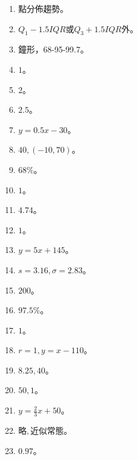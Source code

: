 \begin{enumerate}[label=\arabic*.]
    \item 點分佈趨勢。
    \item $Q_1-1.5IQR$或$Q_3+1.5IQR$外。
    \item 鐘形，68-95-99.7。
    \item $1$。
    \item $2$。
    \item $2.5$。
    \item $y = 0.5x - 30$。
    \item $40, (-10, 70)$。
    \item $68\%$。
    \item $1$。
    \item $4.74$。
    \item $1$。
    \item $y = 5x + 145$。
    \item $s=3.16, \sigma=2.83$。
    \item $200$。
    \item $97.5\%$。
    \item $1$。
    \item $r=1, y=x-110$。
    \item $8.25, 40$。
    \item $50, 1$。
    \item $y = \frac{2}{3}x + 50$。
    \item $略, 近似常態$。
    \item $0.97$。
\end{enumerate}

